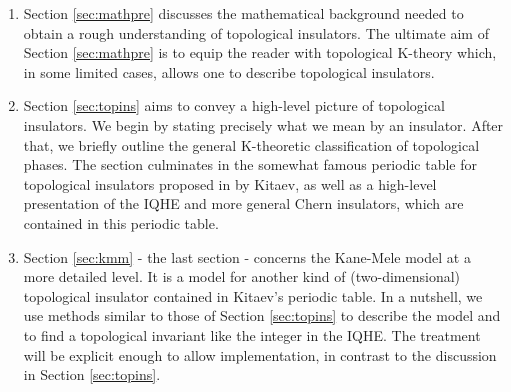 \begin{enumerate}
\item[$\bullet$]
Section \ref{sec:mathpre} discusses the mathematical background needed to obtain a rough understanding of topological insulators.
The ultimate aim of Section \ref{sec:mathpre} is to equip the reader with topological K-theory which, in some limited cases, allows one to describe topological insulators.
\item[$\bullet$]
Section \ref{sec:topins} aims to convey a high-level picture of topological insulators.
We begin by stating precisely what we mean by an insulator.
After that, we briefly outline the general K-theoretic classification of topological phases.
The section culminates in the somewhat famous periodic table for topological insulators proposed in \cite{eda79af1} by Kitaev, as well as a high-level presentation of the IQHE and more general Chern insulators, which are contained in this periodic table.
\item[$\bullet$]
Section \ref{sec:kmm} - the last section - concerns the Kane-Mele model at a more detailed level.
It is a model for another kind of (two-dimensional) topological insulator contained in Kitaev's periodic table.
In a nutshell, we use methods similar to those of Section \ref{sec:topins} to describe the model and to find a topological invariant like the integer in the IQHE.
The treatment will be explicit enough to allow implementation, in contrast to the discussion in Section \ref{sec:topins}.
\end{enumerate}
